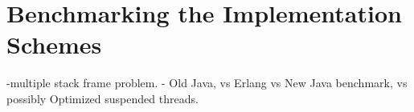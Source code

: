 \section{Benchmarking the Implementation Schemes}

-multiple stack frame problem.
- Old Java, vs Erlang vs New Java benchmark, vs possibly Optimized suspended threads.



